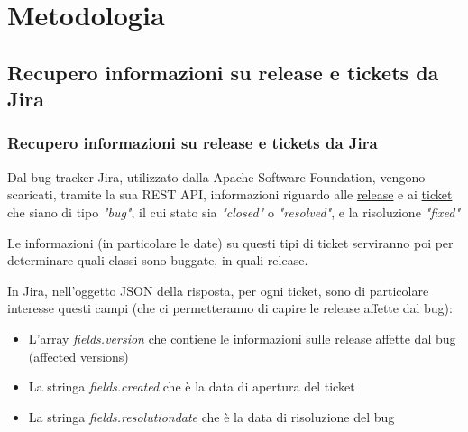 \documentclass{beamer}
\newcommand{\dflvspace}{\vspace{10pt}}
\begin{document}
\section{Metodologia}
\subsection{Recupero informazioni su release e tickets da Jira}
\begin{frame}
	\frametitle{Recupero informazioni su release e tickets da Jira}
	
	Dal bug tracker Jira, utilizzato dalla Apache Software Foundation, vengono scaricati, tramite
	la sua REST API, informazioni riguardo alle \underline{release} e ai \underline{ticket} che siano di tipo
	\textit{"bug"}, il cui stato sia \textit{"closed"} o \textit{"resolved"}, e la risoluzione \textit{"fixed"}
	
	\dflvspace
	
	Le informazioni (in particolare le date) su questi tipi di ticket serviranno 
	poi per determinare quali classi sono buggate, in quali release.
	
	\dflvspace

	In Jira, nell'oggetto JSON della risposta, per ogni ticket, sono di particolare interesse questi campi 
	(che ci permetteranno di capire le release affette dal bug):
	\begin{itemize}
		\item L'array \textit{fields.version}
		che contiene le informazioni sulle release affette dal bug (affected versions)
		\item La stringa \textit{fields.created} che è la data di apertura del ticket
		\item La stringa \textit{fields.resolutiondate} che è la data di risoluzione del bug
	\end{itemize}
\end{frame}
\end{document}
